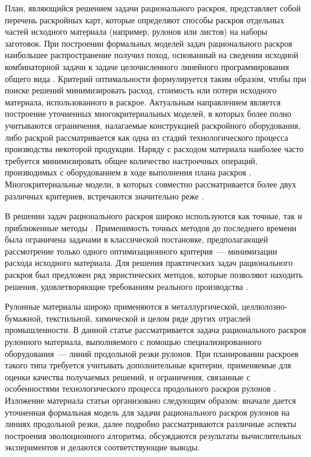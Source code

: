\documentclass[12pt]{article}
\begin{document}
План, являющийся решением задачи рационального раскроя, представляет собой 
перечень раскройных карт, которые определяют способы раскроя отдельных частей 
исходного материала (например, рулонов или листов) на наборы заготовок. При 
построении формальных моделей задач рационального раскроя наибольшее 
распространение получил поход, основанный на сведении исходной комбинаторной 
задачи к задаче целочисленного линейного программирования общего вида 
\cite{decarvalho02}. 
Критерий оптимальности формулируется таким образом, чтобы при поиске решений 
минимизировать расход, стоимость или потери исходного материала, 
использованного в раскрое. Актуальным направлением является построение 
уточненных многокритериальных моделей, в которых более полно учитываются 
ограничения, налагаемые конструкцией раскройного оборудования, либо раскрой 
рассматривается как одна из стадий технологического процесса производства 
некоторой продукции. Наряду с расходом материала наиболее часто требуется 
минимизировать общее количество настроечных операций, производимых с 
оборудованием в ходе выполнения плана раскроя 
\cite{haessler88, foerster00}. 
Многокритериальные 
модели, в которых совместно рассматривается более двух различных критериев, 
встречаются значительно реже 
\cite{belov07}.

В решении задач рационального раскроя широко используются как точные, так и 
приближенные методы 
\cite{haessler91, golovistikov08}. 
Применимость точных методов до последнего времени 
была ограничена задачами в классической постановке, предполагающей рассмотрение 
только одного оптимизационного критерия~--- минимизации расхода исходного 
материала. Для решения практических задач рационального раскроя был предложен 
ряд эвристических методов, которые позволяют находить решения, удовлетворяющие 
требованиям реального производства 
\cite{haessler88, goulimis90, vahrenkamp96, song06, golfeto09, huang09}.

Рулонные материалы широко применяются в металлургической, целлюлозно-бумажной, 
текстильной, химической и целом ряде других отраслей промышленности. В данной 
статье рассматривается задача рационального раскроя рулонного материала, 
выполняемого с помощью специализированного оборудования~--- линий продольной 
резки рулонов. При планировании раскроев такого типа требуется учитывать 
дополнительные критерии, применяемые для оценки качества получаемых решений, и 
ограничения, связанные с особенностями технологического процесса продольного 
раскроя рулонов 
\cite{haessler88, song06}. 
Изложение материала статьи организовано следующим образом: 
вначале дается уточненная формальная модель для задачи рационального раскроя 
рулонов на линиях продольной резки, далее подробно рассматриваются различные 
аспекты построения эволюционного алгоритма, обсуждаются результаты 
вычислительных экспериментов и делаются соответствующие выводы.
\end{document}
